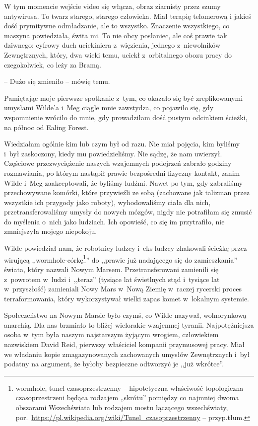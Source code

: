 \documentclass[oneside,polish,11pt,sfheadings]{mwbk}
\begin{document}
W tym momencie wejście video się włącza, obraz ziarnisty przez szumy
antywirusa. To twarz starego, starego człowieka. Miał terapię telomerową
i jakieś dość prymitywne odmładzanie, ale to wszystko. Znaczenie
wszystkiego, co maszyna powiedziała, świta mi. To nie obcy posłaniec,
ale coś prawie tak dziwnego: cyfrowy duch uciekiniera z~więzienia,
jednego z~niewolników Zewnętrznych, który, dwa wieki temu, uciekł z~orbitalnego obozu pracy do czegokolwiek, co leży za Bramą.

-- Dużo się zmieniło -- mówię temu.

Pamiętając moje pierwsze spotkanie z~tym, co okazało się być
zreplikowanymi umysłami Wilde'a i~Meg ciągle mnie zawstydza, co pojawiło
się, gdy wspomnienie wróciło do mnie, gdy prowadziłam dość pustym
odcinkiem ścieżki, na północ od Ealing Forest.

Wiedziałam ogólnie kim lub czym był od razu. Nie miał pojęcia, kim
byliśmy i~był zaskoczony, kiedy mu powiedzieliśmy. Nie sądzę, że nam
uwierzył. Częściowe przezwyciężenie naszych wzajemnych podejrzeń zabrało
godziny rozmawiania, po którym nastąpił prawie bezpośredni fizyczny
kontakt, zanim Wilde i~Meg zaakceptowali, że byliśmy ludźmi. Nawet po
tym, gdy zabraliśmy przechowywane komórki, które przywieźli ze sobą
(zachowane jak talizman przez wszystkie ich przygody jako roboty),
wyhodowaliśmy ciała dla nich, przetransferowaliśmy umysły do nowych
mózgów, nigdy nie potrafiłam się zmusić do myślenia o~nich jako
ludziach. Ich opowieść, co się im przytrafiło, nie zmniejszyła mojego
niepokoju.

Wilde powiedział nam, że robotnicy ludzcy i~eks-ludzcy zhakowali ścieżkę
przez wirującą ,,wormhole-córkę\footnote{wormhole, tunel czasoprzestrzenny --  hipotetyczna właściwość topologiczna czasoprzestrzeni będąca rodzajem „skrótu” pomiędzy co najmniej dwoma obszarami Wszechświata lub rodzajem mostu łączącego wszechświaty, por.~\url{https://pl.wikipedia.org/wiki/Tunel_czasoprzestrzenny} -- przyp.tłum.}'' do ,,prawie już nadającego się do
zamieszkania'' świata, który nazwali Nowym Marsem. Przetransferowani
zamienili się z~powrotem w~ludzi i~,,teraz'' (tysiące lat świetlnych
stąd i~tysiące lat w~przyszłość) zamieniali Nowy Mars w~Nową Ziemię w~raczej rycerski proces terraformowania, który wykorzystywał wielki zapas
komet w~lokalnym systemie.

Społeczeństwo na Nowym Marsie było czymś, co Wilde nazywał, wolnorynkową
anarchią. Dla nas brzmiało to bliżej wielorakie wzajemnej tyranii.
Najpotężniejsza osoba w~tym była naszym najstarszym żyjącym wrogiem,
człowiekiem nazwiskiem David Reid, pierwszy właściciel kompanii
przymusowej pracy. Miał we władaniu kopie zmagazynowanych zachowanych
umysłów Zewnętrznych i~był podatny na argument, że byłoby bezpieczne
odtworzyć je ,,już wkrótce''.
\end{document}

